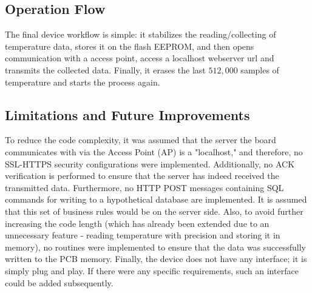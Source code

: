 \subsection{Operation Flow}\label{01Sub:OperationFlow}

The final device workflow is simple: it stabilizes the reading/collecting of temperature data,
stores it on the flash EEPROM, and then opens communication with a access point, access a 
localhost webserver url and transmits the collected data. Finally, it erases the last $512,000$
samples of temperature and starts the process again.


\subsection{Limitations and Future Improvements}\label{01Sub:LimitationsAndFutureImprovements}


To reduce the code complexity, it was assumed that the server the board communicates with via the Access Point (AP) is a 
"localhost," and therefore, no SSL-HTTPS security configurations were implemented. Additionally, no ACK verification is performed 
to ensure that the server has indeed received the transmitted data. Furthermore, no HTTP POST messages containing SQL commands 
for writing to a hypothetical database are implemented. It is assumed that this set of business rules would be on the server side. 
Also, to avoid further increasing the code length (which has already been extended due to an unnecessary feature - reading 
temperature with precision and storing it in memory), no routines were implemented to ensure that the data was successfully written 
to the PCB memory. Finally, the device does not have any interface; it is simply plug and play. If there were any specific 
requirements, such an interface could be added subsequently.



